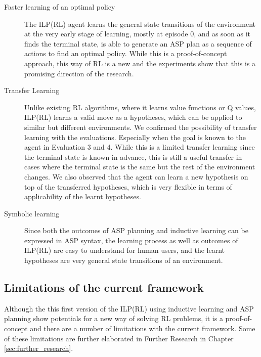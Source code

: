 \begin{description}
\item[Faster learning of an optimal policy]
The ILP(RL) agent learns the general state transitions of the environment at the very early stage of learning, mostly at episode 0, and as soon as it finds the terminal state, is able to generate an ASP plan as a sequence of actions to find an optimal policy.
While this is a proof-of-concept approach, this way of RL is a new and the experiments show that this is a promising direction of the research.

\item[Transfer Learning]
Unlike existing RL algorithms, where it learns value functions or Q values, ILP(RL) learns a valid move as a hypotheses, which can be applied to similar but different environments.
We confirmed the possibility of transfer learning with the evaluations. Especially when the goal is known to the agent in Evaluation 3 and 4.
While this is a limited transfer learning since the terminal state is known in advance, this is still a useful transfer in cases where the terminal state is the same but the rest of the environment changes.
We also observed that the agent can learn a new hypothesis on top of the transferred hypotheses, which is very flexible in terms of applicability of the learnt hypotheses.

\item[Symbolic learning]
Since both the outcomes of ASP planning and inductive learning can be expressed in ASP syntax, the learning process as well as outcomes of ILP(RL) are easy to understand for human users, and the learnt hypotheses are very general state transitions of an environment.
\end{description} 



\subsection{Limitations of the current framework}
\label{subsec:limitations}
Although the this first version of the ILP(RL) using inductive learning and ASP planning show potentials for a new way of solving RL problems, it is a proof-of-concept and there are a number of limitations with the current framework.
Some of these limitations are further elaborated in Further Research in Chapter \ref{sec:further_research}.

